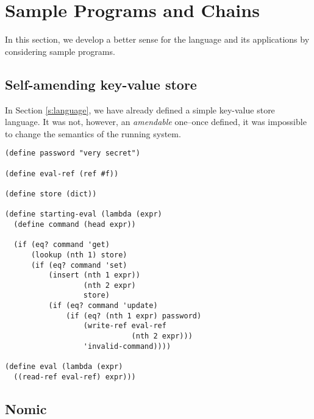 \section{Sample Programs and Chains}

In this section, we develop a better sense for the language and its
applications by considering sample programs.

\subsection{Self-amending key-value store}

In Section \ref{s:language}, we have already defined a simple key-value store
language. It was not, however, an \textit{amendable} one--once defined, it was
impossible to change the semantics of the running system.

\begin{lstlisting}
(define password "very secret")

(define eval-ref (ref #f))

(define store (dict))

(define starting-eval (lambda (expr)
  (define command (head expr))

  (if (eq? command 'get)
      (lookup (nth 1) store)
      (if (eq? command 'set)
          (insert (nth 1 expr))
                  (nth 2 expr)
                  store)
          (if (eq? command 'update)
              (if (eq? (nth 1 expr) password)
                  (write-ref eval-ref
                             (nth 2 expr)))
                  'invalid-command))))

(define eval (lambda (expr)
  ((read-ref eval-ref) expr)))
\end{lstlisting}


\subsection{Nomic}
\label{s:examples}
